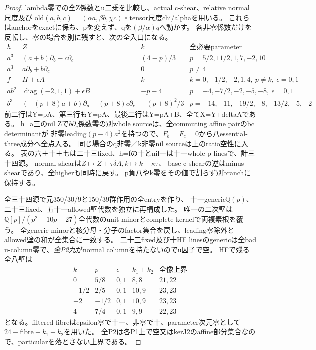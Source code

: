 \documentclass[a4paper,11pt]{ltjsarticle}
\theoremstyle{definition}
\begin{document}
\begin{proof}
lambda零での全Z係数とu二乗を比較し、actual c-shear、relative normal尺度及び
old$(a,b,c)=(\alpha a,\beta b,\chi c)$・tensor尺度chi/alphaを用いる。
これらはanchorをexactに保ち、pを変えず、qを$(\beta/\alpha)q$へ動かす。
各非零係数だけを反転し、零の場合を別に残すと、次の全入口になる。
\[
\begin{array}{c|c|c|c}
 h&Z&k&\text{全必要parameter}\\\hline
 a^3&(a+b)\partial_b-c\partial_c&(4-p)/3&p=5/2,11/2,1,7,-2,10\\
 a^3&a\partial_b+b\partial_c&0&p\ne4\\
 f&H+\epsilon A&k&k=0,-1/2,-2,1,4,\ p\ne k,\ \epsilon=0,1\\
 ab^2&\operatorname{diag}(-2,1,1)+\epsilon B&-p-4&p=-4,-7/2,-2,-5,-8,\ \epsilon=0,1\\
 b^3&(-(p+8)a+b)\partial_a+(p+8)c\partial_c&-(p+8)^2/3&p=-14,-11,-19/2,-8,-13/2,-5,-2
\end{array}
\]
前二行はY=pA、第三行もY=pA、最後二行はY=pA+B、全てX=Y+deltaAである。
h=a三のnil Zで$b\partial_c$係数零の別whole sourceは、全commuting affine pairのbc determinantが
非零leading$(p-4)a^2$を持つので、$F_b=F_c=0$から八essential-three成分へ全点入る。
同じ場合のq非零／k非零nil sourceは上のratio空性に入る。
表の六＋十＋七は二十三fixed、h=fの十とnil一は十一whole p-linesで、計三十四源。
normal shearは$Z\mapsto Z+\tau\delta A,k\mapsto k-\kappa\tau$、
base c-shearの逆はminus shearであり、全higherも同時に戻す。
p負八やk零をその値で割らず別branchに保持する。

全三十四源で元350/30/9と150/39群作用の全entryを作り、
十一generic$\mathbb Q(p)$、二十三fixed、五十一allowed壁代数を独立に再構成した。
唯一の二次壁は$\mathbb Q[p]/(p^2-10p+27)$全代数のunit minorとcomplete kernelで両複素根を覆う。
全generic minorと核分母・分子のfactor集合を戻し、leading零除外とallowed壁の和が全集合に一致する。
二十三fixed及び十HF linesのgenericは全bad u-column零で、\emph{全P2九}がnormal columnを持たないのでu因子で空。
HFで残る全八壁は
\[
\begin{array}{c|c|c|c|c}
 k&p&\epsilon&k_1+k_2&\text{全像上界}\\\hline
 0&5/8&0,1&8,8&21,22\\
 -1/2&2/5&0,1&10,9&23,23\\
 -2&-1/2&0,1&10,9&23,23\\
 4&7/4&0,1&9,9&22,23
\end{array}
\]
となる。filtered fibreはepsilon零で十一、非零で十、parameter次元零として
$24-\text{fibre}+k_1+k_2$を用いた。
全P2は各P1上で空又はkerJ2のaffine部分集合なので、particularを落とさない上界である。


\end{proof}
\end{document}
